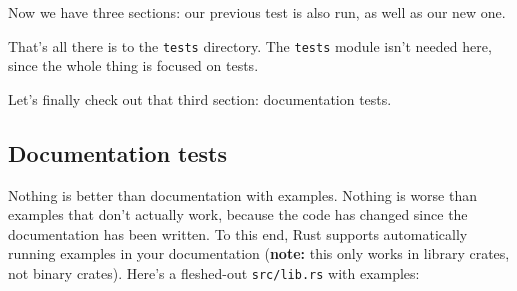 \documentclass[a4paper,]{book}
\newenvironment{Shaded}{\begin{snugshade}}{\end{snugshade}}
\newcommand{\KeywordTok}[1]{\textcolor[rgb]{0.13,0.29,0.53}{\textbf{{#1}}}}
\newcommand{\NormalTok}[1]{{#1}}
\begin{document}
\begin{Shaded}
\end{Shaded}

Now we have three sections: our previous test is also run, as well as
our new one.

That's all there is to the \texttt{tests} directory. The \texttt{tests}
module isn't needed here, since the whole thing is focused on tests.

Let's finally check out that third section: documentation tests.

\subsection{Documentation tests}\label{documentation-tests}

Nothing is better than documentation with examples. Nothing is worse
than examples that don't actually work, because the code has changed
since the documentation has been written. To this end, Rust supports
automatically running examples in your documentation (\textbf{note:}
this only works in library crates, not binary crates). Here's a
fleshed-out \texttt{src/lib.rs} with examples:
\end{document}
